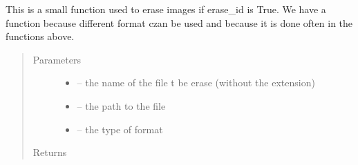 \documentclass[letterpaper,10pt,english]{sphinxmanual}
\begin{document}

\begin{fulllineitems}
\label{\detokenize{index:src.calcul_hab.remove_image}}
This is a small function used to erase images if erase\_id is True. We have a function because different format
czan be used and because it is done often in the functions above.
\begin{quote}\begin{description}
\item[{Parameters}] \leavevmode\begin{itemize}
\item {} 
 -- the name of the file t be erase (without the extension)

\item {} 
 -- the path to the file

\item {} 
 -- the type of format

\end{itemize}

\item[{Returns}] \leavevmode


\end{description}\end{quote}

\end{fulllineitems}

\end{document}
